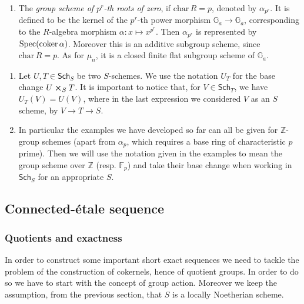 \begin{ex}
\begin{enumerate}
		\item The {\em group scheme of $p^r$-th roots of zero},
			if $\mathrm{char}\, R = p$, denoted by $\alpha_{p^r}$. 
			It is defined to be the kernel of the $p^r$-th power
			morphism $\mathbb{G}_a \to \mathbb{G}_a$,
			corresponding to the $R$-algebra morphism
			$\alpha\colon x \mapsto x^{p^r}$.
			Then $\alpha_{p^r}$ is represented by $\mathrm{Spec}(\operatorname{coker} \alpha)$.
			Moreover this is an additive subgroup scheme, since $\mathrm{char}\, R = p$.
			As for $\mu_n$, it is a closed finite flat subgroup scheme of 
			$\mathbb{G}_a$.
	\end{enumerate}
\end{ex}


\begin{rem}\leavevmode\vspace{-\baselineskip}
\begin{enumerate}
\item 	Let $U, T \in \mathsf{Sch}_{ S }$ be two $S$-schemes.
	We use the notation $U_T$ for the base change $U \cross_{ S } T$.
	It is important to notice that, for $V \in \mathsf{Sch}_{ T }$, we 
	have $U_T(V) = U(V)$, where in the last expression
	we considered $V$ as an $S$ scheme, by $V \to T \to S$.


\item	In particular the examples we have developed so far 
	can all be given for $\mathbb{Z}$-group schemes
	(apart from $\alpha_p$, which requires a base ring
	of characteristic $p$ prime).
	Then we will use the notation given in the examples
	to mean the group scheme over $\mathbb{Z}$ (resp$.$ $\mathbb{F}_{p}$)
	and take their base change when working in $\mathsf{Sch}_{ S }$
	for an appropriate $S$.
\end{enumerate}
\end{rem}


\subsection{Connected-étale sequence}
\subsubsection{Quotients and exactness}
In order to construct some important short exact sequences
we need to tackle the problem of the construction
of cokernels, hence of quotient groups.
In order to do so we have to start with the concept of group action.
Moreover we keep the assumption, from the previous section, that $S$
is a locally Noetherian scheme.

